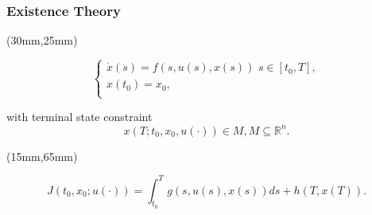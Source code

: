 \begin{frame}
	\frametitle{Existence Theory}
	\begin{textblock*}{70mm}(30mm,25mm)
		\begin{greenbox}{}
			$$\left\{ \begin{array}{l}
			\dot{x}(s)=f(s,u(s),x(s))\,\,s\in [t_0,T], \\
			x(t_0)=x_0,\\
			\end{array}
			\right.$$
	
			with terminal state constraint
			$$x(T;t_0,x_0,u(\cdot))\in M, M\subseteq \mathbb{R}^n.$$
			
		\end{greenbox}
	\end{textblock*}
	\begin{textblock*}{100mm}(15mm,65mm)
		\begin{yellowbox}{}
			$$J(t_0,x_0;u(\cdot))=\int_{t_0}^{T}g(s,u(s),x(s))ds+h(T,x(T)).$$
		\end{yellowbox}
	\end{textblock*}
\end{frame}

